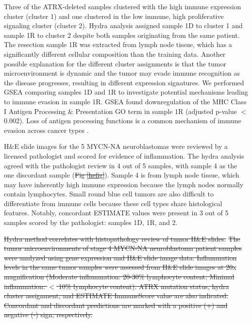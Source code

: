 \documentclass[10pt,letterpaper]{article}
\providecommand{\DIFdeltex}[1]{{\protect\color{red}\sout{#1}}}                      %
\providecommand{\DIFaddbegin}{} %
\providecommand{\DIFaddend}{} %
\providecommand{\DIFdelbegin}{} %
\providecommand{\DIFdelend}{} %
\providecommand{\DIFdelFL}[1]{\DIFdel{#1}} %
\providecommand{\DIFdel}[1]{\texorpdfstring{\DIFdeltex{#1}}{}} %
\newcommand{\DIFscaledelfig}{0.5}
\newlength{\DIFdelgraphicswidth} %
\newlength{\DIFdelgraphicsheight} %
\newcommand{\DIFaddincludegraphics}[2][]{{\color{blue}\fbox{\DIFOincludegraphics[#1]{#2}}}} %
\newcommand{\DIFdelincludegraphics}[2][]{%
\sbox{\DIFdelgraphicsbox}{\DIFOincludegraphics[#1]{#2}}%
\settoboxwidth{\DIFdelgraphicswidth}{\DIFdelgraphicsbox} %
\settoboxtotalheight{\DIFdelgraphicsheight}{\DIFdelgraphicsbox} %
\scalebox{\DIFscaledelfig}{%
\parbox[b]{\DIFdelgraphicswidth}{\usebox{\DIFdelgraphicsbox}\\[-\baselineskip] \rule{\DIFdelgraphicswidth}{0em}}\llap{\resizebox{\DIFdelgraphicswidth}{\DIFdelgraphicsheight}{%
\setlength{\unitlength}{\DIFdelgraphicswidth}%
\begin{picture}(1,1)%
\thicklines\linethickness{2pt} %
{\color[rgb]{1,0,0}\put(0,0){\framebox(1,1){}}}%
{\color[rgb]{1,0,0}\put(0,0){\line( 1,1){1}}}%
{\color[rgb]{1,0,0}\put(0,1){\line(1,-1){1}}}%
\end{picture}%
}\hspace*{3pt}}} %
} %
\DeclareRobustCommand{\DIFaddbegin}{\DIFOaddbegin \let\includegraphics\DIFaddincludegraphics} %
\DeclareRobustCommand{\DIFaddend}{\DIFOaddend \let\includegraphics\DIFOincludegraphics} %
\DeclareRobustCommand{\DIFdelbegin}{\DIFOdelbegin \let\includegraphics\DIFdelincludegraphics} %
\DeclareRobustCommand{\DIFdelend}{\DIFOaddend \let\includegraphics\DIFOincludegraphics} %
\begin{document}
Three of the ATRX-deleted samples clustered with the high immune expression cluster (cluster 1) and one clustered in the low immune, high proliferative signaling cluster (cluster 2). Hydra analysis assigned sample 1D to cluster 1 and sample 1R to cluster 2 despite both samples originating from the same patient. The resection sample 1R was extracted from lymph node tissue, which has a significantly different cellular composition than the training data. Another possible explanation for the different cluster assignments is that the tumor microenvironment is dynamic and the tumor may evade immune recognition as the disease progresses, resulting in different expression signatures. We performed GSEA comparing samples 1D and 1R to investigate potential mechanisms leading to immune evasion in sample 1R. GSEA found downregulation of the MHC Class I Antigen Processing \& Presentation GO term in sample 1R (adjusted p-value $<$ 0.002). Loss of antigen processing functions is a common mechanism of immune evasion across cancer types \cite{reevesAntigenProcessingImmune2017}. 

H\&E slide images for the 5 MYCN-NA neuroblastomas were reviewed by a licensed pathologist and scored for evidence of inflammation. The hydra analysis agreed with the pathologist review in 4 out of 5 samples, with sample 4 as the one discordant sample (\DIFdelbegin \DIFdel{Fig \ref{hefig}}\DIFdelend \DIFaddbegin {}\DIFaddend ). Sample 4 is from lymph node tissue, which may have inherently high immune expression because the lymph nodes normally contain lymphocytes. Small round blue cell tumors are also difficult to differentiate from immune cells because these cell types share histological features. Notably, concordant ESTIMATE values were present in 3 out of 5 samples scored by the pathologist: samples 1D, 1R, and 2. 


\DIFdelbegin %
{%
\DIFdelFL{Hydra method correlates with histopathology review of tumor H\&E slides.}%
\DIFdelFL{The tumor microenvironments of stage 4 MYCN-NA neuroblastoma patient samples were analyzed using gene expression and H\&E slide image data. Inflammation levels in the same tumor samples were assessed from H\&E slide images at 20x magnification (Moderate inflammation: 20-30\% lymphocyte content; Minimal inflammation: $<$ 10\% lymphocyte content). ATRX mutation status, hydra cluster assignment, and ESTIMATE ImmuneScore value are also indicated. Concordant and discordant predictions are marked with a positive (+) and negative (-) sign, respectively.}}
\end{document}
